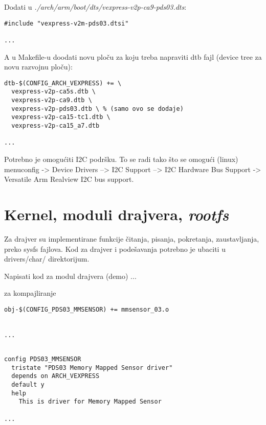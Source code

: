 \documentclass{article}
\begin{document}
Dodati u \textit{./arch/arm/boot/dts/vexpress-v2p-ca9-pds03.dts}:

\begin{file}[Makefile]
\begin{verbatim}
#include "vexpress-v2m-pds03.dtsi"

...
\end{verbatim}
\end{file}

A u Makefile-u doodati novu ploču za koju treba napraviti dtb fajl (device tree za novu razvojnu ploču):

\begin{file}[Makefile]
\begin{verbatim}
dtb-$(CONFIG_ARCH_VEXPRESS) += \
  vexpress-v2p-ca5s.dtb \
  vexpress-v2p-ca9.dtb \
  vexpress-v2p-pds03.dtb \ % (samo ovo se dodaje)
  vexpress-v2p-ca15-tc1.dtb \
  vexpress-v2p-ca15_a7.dtb

...
\end{verbatim}
\end{file}


Potrebno je omogućiti I2C podršku. To se radi tako što se omogući (linux) menuconfig -> Device Drivers –> I2C Support –> I2C Hardware Bus Support -> Versatile Arm Realview I2C bus support. \\


\section{Kernel, moduli drajvera, \textit{rootfs}}


Za drajver su implementirane funkcije čitanja, pisanja, pokretanja, zaustavljanja, preko sysfs fajlova. Kod za drajver i podešavanja potrebno je ubaciti u drivers/char/ direktorijum. 

Napisati kod za modul drajvera (demo) ...

za kompajliranje



\begin{file}
\begin{verbatim}
obj-$(CONFIG_PDS03_MMSENSOR) += mmsensor_03.o


...
\end{verbatim}
\end{file}


\begin{file}
\begin{verbatim}

config PDS03_MMSENSOR
  tristate "PDS03 Memory Mapped Sensor driver"
  depends on ARCH_VEXPRESS
  default y
  help
    This is driver for Memory Mapped Sensor

...
\end{verbatim}
\end{file}
\end{document}
